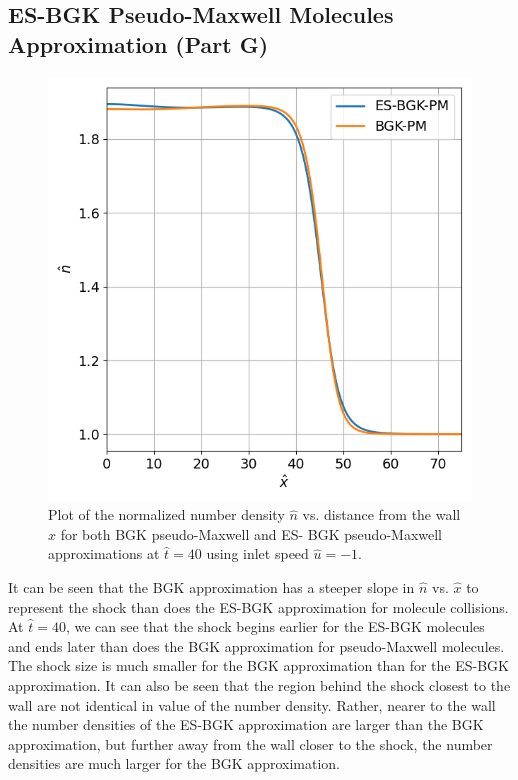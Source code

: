 \documentclass[a4paper]{article}
\begin{document}
\subsection{ES-BGK Pseudo-Maxwell Molecules Approximation (Part G)}
\begin{figure}[hbt!]
    \centering
    \includegraphics[width=14cm]{plots/problem_g_n.png}
    \caption{\centering Plot of the normalized number density $\hat{n}$ vs. distance from the wall $\hat{x}$ for both BGK pseudo-Maxwell and ES- BGK pseudo-Maxwell approximations at $\hat{t} = 40$ using inlet speed $\hat{u} = -1$.}
    \label{problem_g_n}
\end{figure}
It can be seen that the BGK approximation has a steeper slope in $\hat{n}$ vs. $\hat{x}$ to represent the shock than does the ES-BGK approximation for molecule collisions. At $\hat{t} = 40$, we can see that the shock begins earlier for the ES-BGK molecules and ends later than does the BGK approximation for pseudo-Maxwell molecules. The shock size is much smaller for the BGK approximation than for the ES-BGK approximation. It can also be seen that the region behind the shock closest to the wall are not identical in value of the number density. Rather, nearer to the wall the number densities of the ES-BGK approximation are larger than the BGK approximation, but further away from the wall closer to the shock, the number densities are much larger for the BGK approximation. 
\end{document}

